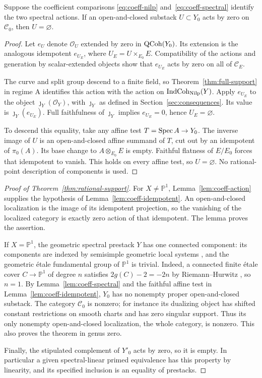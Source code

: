 \begin{lemma}\label{lem:coeff-idempotent}
Suppose the coefficient comparisons
\eqref{eq:coeff-nilp} and~\eqref{eq:coeff-spectral} identify the two
spectral actions. If an open-and-closed substack $U\subset Y_0$ acts
by zero on $\mathcal C_0$, then $U=\varnothing$.
\end{lemma}
\begin{proof}
Let $e_U$ denote $\mathcal O_U$ extended by zero in $\operatorname{QCoh}(Y_0)$.
Its extension is the analogous idempotent $e_{U_E}$, where
$U_E=U\times_{E_0}E$. Compatibility of the actions and generation
by scalar-extended objects show that $e_{U_E}$ acts by zero on all
of $\mathcal C_E$.

The curve and split group descend to a finite field, so
Theorem~\ref{thm:full-support} in regime A identifies this action
with the action on $\operatorname{IndCoh}_{\operatorname{Nilp}}(Y)$. Apply $e_{U_E}$ to the
object $\jmath_Y(\mathcal O_Y)$, with $\jmath_Y$ as defined in
Section~\ref{sec:consequences}. Its value is $\jmath_Y(e_{U_E})$.
Full faithfulness of $\jmath_Y$ implies $e_{U_E}=0$, hence
$U_E=\varnothing$.

To descend this equality, take any affine test $T=\operatorname{Spec} A\to Y_0$.
The inverse image of $U$ is an open-and-closed affine summand of $T$,
cut out by an idempotent of $\pi_0(A)$. Its base change to
$A\otimes_{E_0}E$ is empty. Faithful flatness of $E/E_0$ forces that
idempotent to vanish. This holds on every affine test, so
$U=\varnothing$. No rational-point description of components is used.
\end{proof}

\begin{proof}[Proof of Theorem~\ref{thm:rational-support}]
For $X\ne\mathbb P^1$, Lemma~\ref{lem:coeff-action} supplies the
hypothesis of Lemma~\ref{lem:coeff-idempotent}. An open-and-closed
localization is the image of its idempotent projection, so the
vanishing of the localized category is exactly zero action of that
idempotent. The lemma proves the assertion.

If $X=\mathbb P^1$, the geometric spectral prestack $Y$ has one
connected component: its components are indexed by semisimple
geometric local systems \cite[Proposition~3.7.2]{AGKRRV}, and the
geometric \'etale fundamental group of $\mathbb P^1$ is trivial.
Indeed, a connected finite \'etale cover $C\to\mathbb P^1$ of degree
$n$ satisfies $2g(C)-2=-2n$ by Riemann--Hurwitz
\cite[Tag~0C1B]{Stacks}, so $n=1$. By
Lemma~\ref{lem:coeff-spectral} and the faithful affine test in
Lemma~\ref{lem:coeff-idempotent}, $Y_0$ has no nonempty proper
open-and-closed substack. The category $\mathcal C_0$ is nonzero;
for instance its dualizing object has shifted constant restrictions
on smooth charts and has zero singular support. Thus its only
nonempty open-and-closed localization, the whole category, is
nonzero. This also proves the theorem in genus zero.

Finally, the stipulated complement of $Y'_0$ acts by zero, so it is
empty. In particular a given spectral-linear primed equivalence
has this property by linearity, and its specified inclusion is an
equality of prestacks.
\end{proof}

